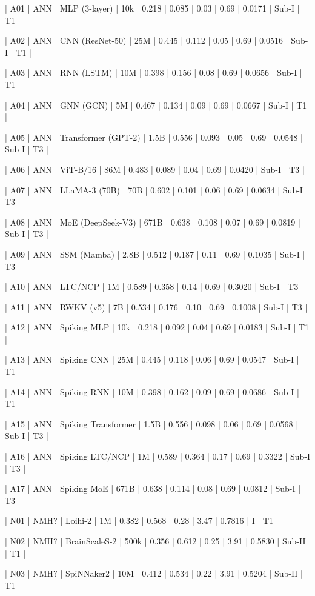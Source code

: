 \documentclass[a4paper,12pt]{article}
\begin{document}
| A01 | ANN | MLP (3-layer) | 10k | 0.218 | 0.085 | 0.03 | 0.69 | 0.0171 | Sub-I | T1 |

| A02 | ANN | CNN (ResNet-50) | 25M | 0.445 | 0.112 | 0.05 | 0.69 | 0.0516 | Sub-I | T1 |

| A03 | ANN | RNN (LSTM) | 10M | 0.398 | 0.156 | 0.08 | 0.69 | 0.0656 | Sub-I | T1 |

| A04 | ANN | GNN (GCN) | 5M | 0.467 | 0.134 | 0.09 | 0.69 | 0.0667 | Sub-I | T1 |

| A05 | ANN | Transformer (GPT-2) | 1.5B | 0.556 | 0.093 | 0.05 | 0.69 | 0.0548 | Sub-I | T3 |

| A06 | ANN | ViT-B/16 | 86M | 0.483 | 0.089 | 0.04 | 0.69 | 0.0420 | Sub-I | T3 |

| A07 | ANN | LLaMA-3 (70B) | 70B | 0.602 | 0.101 | 0.06 | 0.69 | 0.0634 | Sub-I | T3 |

| A08 | ANN | MoE (DeepSeek-V3) | 671B | 0.638 | 0.108 | 0.07 | 0.69 | 0.0819 | Sub-I | T3 |

| A09 | ANN | SSM (Mamba) | 2.8B | 0.512 | 0.187 | 0.11 | 0.69 | 0.1035 | Sub-I | T3 |

| A10 | ANN | LTC/NCP | 1M | 0.589 | 0.358 | 0.14 | 0.69 | 0.3020 | Sub-I | T3 |

| A11 | ANN | RWKV (v5) | 7B | 0.534 | 0.176 | 0.10 | 0.69 | 0.1008 | Sub-I | T3 |

| A12 | ANN | Spiking MLP | 10k | 0.218 | 0.092 | 0.04 | 0.69 | 0.0183 | Sub-I | T1 |

| A13 | ANN | Spiking CNN | 25M | 0.445 | 0.118 | 0.06 | 0.69 | 0.0547 | Sub-I | T1 |

| A14 | ANN | Spiking RNN | 10M | 0.398 | 0.162 | 0.09 | 0.69 | 0.0686 | Sub-I | T1 |

| A15 | ANN | Spiking Transformer | 1.5B | 0.556 | 0.098 | 0.06 | 0.69 | 0.0568 | Sub-I | T3 |

| A16 | ANN | Spiking LTC/NCP | 1M | 0.589 | 0.364 | 0.17 | 0.69 | 0.3322 | Sub-I | T3 |

| A17 | ANN | Spiking MoE | 671B | 0.638 | 0.114 | 0.08 | 0.69 | 0.0812 | Sub-I | T3 |

| N01 | NMH? | Loihi-2 | 1M | 0.382 | 0.568 | 0.28 | 3.47 | 0.7816 | I | T1 |

| N02 | NMH? | BrainScaleS-2 | 500k | 0.356 | 0.612 | 0.25 | 3.91 | 0.5830 | Sub-II | T1 |

| N03 | NMH? | SpiNNaker2 | 10M | 0.412 | 0.534 | 0.22 | 3.91 | 0.5204 | Sub-II | T1 |
\end{document}
